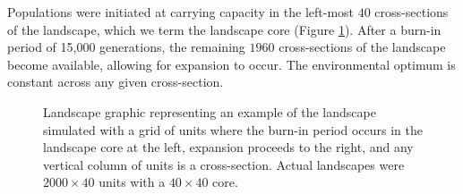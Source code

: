 
Populations were initiated at carrying capacity in the left-most $40$ cross-sections of the landscape, which we term the landscape core (Figure \ref{fig:landscape}). After a burn-in period of 15,000 generations, the remaining $1960$ cross-sections of the landscape become available, allowing for expansion to occur. The environmental optimum is constant across any given cross-section.

\begin{figure}[h]
\centering
{}
\caption[~- Landscape graphic.]{Landscape graphic representing an example of the landscape simulated with a grid of units where the burn-in period occurs in the landscape core at the left, expansion proceeds to the right, and any vertical column of units is a cross-section. Actual landscapes were $2000\times40$ units with a $40\times40$ core.}
\label{fig:landscape}
\end{figure}


